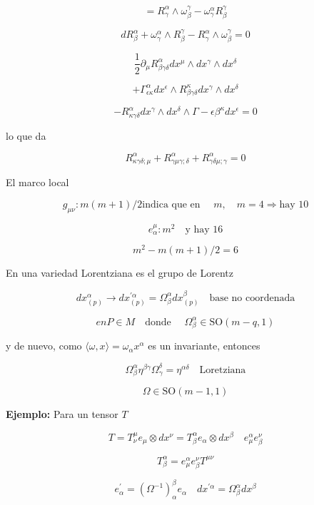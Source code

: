 \documentclass{report}
\begin{document}
{\[= R_{\gamma}^{\alpha} \wedge \omega_{\beta}^{\gamma} - \omega_{\gamma}^{\alpha} R_{\beta}^{\gamma}\]

\[dR _{\beta}^{\alpha} + \omega _{\gamma}^{\alpha} \wedge R_{\beta}^{\gamma} - R_{\gamma}^{\alpha} \wedge \omega _{\beta}^{\gamma} = 0\]

\[\frac{1}{2} \partial _{\mu} R^{\alpha}_{\beta\gamma \delta} dx^{\mu} \wedge dx^{\gamma } \wedge dx^{\delta} \]

\[+ \Gamma_{\epsilon \kappa }^{\alpha} dx^{\epsilon} \wedge R_{\beta \gamma \delta }^{\kappa} dx^{\gamma} \wedge dx^{\delta } \]

\[- R_{\kappa \gamma \delta}^{\alpha } dx^{\gamma} \wedge dx^{\delta} \wedge \Gamma-{\epsilon \beta} ^{\kappa } dx^{\epsilon } = 0 \]

lo que da

\[R_{\kappa \gamma \delta ; \mu }^{\alpha} + R_{\gamma \mu \gamma ; \delta}^{\alpha} + R_{\gamma \delta \mu ; \gamma} ^{\alpha} = 0 \]

El marco local

\[g_{\mu\nu} : m(m+1)/2 \text{indica que en } \quad m , \quad m=4 \Rightarrow \text{hay 10}\]

\[e_{\alpha}^{\mu} : m^2 \quad \text{y hay 16}\]

\[m^2 - m(m+1)/2 = 6\]

En una variedad Lorentziana es el grupo de Lorentz

\[dx_{(p)}^{\alpha} \rightarrow dx^{\prime \alpha}_{(p)} = \Omega _{\beta}^{\alpha} dx_{(p)}^{\beta} \quad \text{base no coordenada}\]

\[en P \in M \quad \text{donde } \quad \Omega _{\beta }^{\alpha}\in \text{SO}(m-q,1)\]

y de nuevo, como $\langle \omega , x\rangle = \omega _{\alpha} x^{\alpha}$ es un invariante, entonces

\[\Omega_{\beta} ^{\alpha}\eta ^{\beta \gamma}\Omega_{\gamma}^{\delta} = \eta ^{\alpha\delta} \quad \text{Loretziana} \]

\[\Omega\in \text{SO}(m-1,1)\]

\textbf{Ejemplo: }Para un tensor $T$

\[T = T_{\nu}^{\mu} e_{\mu}\otimes dx^{\nu} = T_{\beta}^{\alpha} e_{\alpha} \otimes dx^{\beta} \quad e_{\mu}^{\alpha} e_{\beta}^{\nu}\]

\[T_{\beta}^{\alpha} = e_{\mu}^{\alpha}e_{\beta}^{\nu}T^{\mu \nu}\]

\[e_{\alpha}^{\prime} = (\Omega^{-1})_{\alpha}^{\beta} e_{\alpha} \quad dx^{\prime \alpha} =\Omega _{\beta}^{\alpha}dx^{\beta}\]

}
\end{document}
